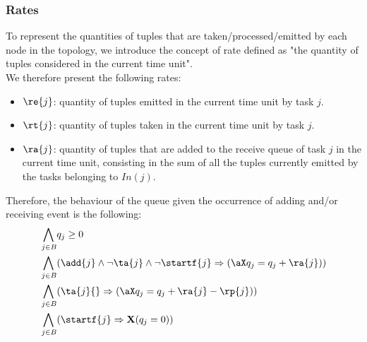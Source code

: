 \subsubsection*{Rates}
To represent the quantities of tuples that are taken/processed/emitted by each node in the topology, we introduce the concept of rate defined as "the quantity of tuples considered in the current time unit". \\
We therefore present the following rates:
\begin{itemize}
\item $\re{j}$: quantity of tuples emitted in the current time unit by task $j$.
\item $\rt{j}$: quantity of tuples taken in the current time unit by task $j$.
\item $\ra{j}$: quantity of tuples that are added to the receive queue of task $j$ in the current time unit, consisting in the sum of all the tuples currently emitted by the tasks belonging to $In(j)$.
\end{itemize}
%
Therefore, the behaviour of the queue given the occurrence of adding and/or receiving event is the following:
%
\begin{align*}
\bigwedge_{
\begin{subarray}{c}
\,j \in B
\end{subarray}
} & q_j \geq  0\\ %
%
 \bigwedge_{
\begin{subarray}{c}
\,j \in B
\end{subarray}
} &( \add{j}  \wedge \lnot \ta{j}  \land \lnot \startf{j}
\Rightarrow (\aX q_j = q_j + \ra{j} ))\\ %
%
%
 \bigwedge_{
\begin{subarray}{c}
\,j \in B
\end{subarray}
} &( \ta{j}{}  \Rightarrow (\aX q_j = q_j + \ra{j} - \rp{j} )) \\%
%
%
%
%
%
%
 \bigwedge_{
\begin{subarray}{c}
\,j \in B
\end{subarray}
} &( \startf{j}
\Rightarrow \mathbf{X}( q_j = 0 ))
\end{align*}
